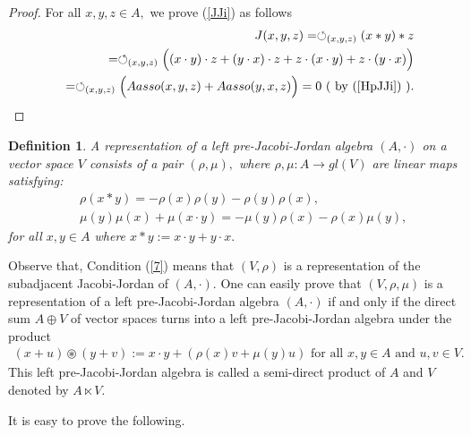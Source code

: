 \documentclass[12pt]{amsart}
\newtheorem{definition}[Theorem]{Definition}
\begin{document}
\begin{proof}
	For all $x,y,z\in A,$ we prove (\ref{JJi}) as follows
	\begin{eqnarray}
		&&J(x,y,z)=\circlearrowleft_{(x,y,z)}(x\ast y)\ast z\nonumber\\
		&&=\circlearrowleft_{(x,y,z)}
		\Big((x\cdot y)\cdot z
		+(y\cdot x)\cdot z+z\cdot(x\cdot y)+z\cdot(y\cdot x) \Big)\nonumber\\
		&&=\circlearrowleft_{(x,y,z)}\Big(Aasso(x,y,z)+Aasso(y,x,z) \Big)=0 \mbox{ ( by (\ref{HpJJi}) ).}\nonumber
	\end{eqnarray}
\end{proof}
	\begin{definition}\cite{aod}\label{rpHJJcl}
		A representation of a left pre-Jacobi-Jordan algebra $(A,\cdot)$ on a vector space $V$ consists of a pair $(\rho, \mu),$ where $\rho,\mu: A\rightarrow gl(V )$  are linear maps satisfying:
		\begin{eqnarray}
			&&\rho(x\ast y)=-\rho(x)\rho(y)-\rho(y)\rho(x),
			\label{7}\\
			&&\mu(y)\mu(x)+\mu(x\cdot y)=-\mu(y)\rho(x)-\rho(x)\mu(y), \label{8}
		\end{eqnarray}
		for all $x,y\in A$ where $x\ast y:=x\cdot y+y\cdot x.$
	\end{definition}
	Observe that, Condition (\ref{7}) means that $(V,\rho)$ is a representation of the subadjacent Jacobi-Jordan of $(A,\cdot).$ One can easily prove that $(V,\rho,\mu)$  is a representation of a left pre-Jacobi-Jordan algebra $(A,\cdot)$ if and only if the direct sum $A\oplus V$ of vector spaces turns into a left pre-Jacobi-Jordan algebra under the product
	\begin{eqnarray}
		(x+u)\circledast (y+v):=x\cdot y+(\rho(x)v+\mu(y)u) \mbox{ for all $x,y\in A$ 
			and $u,v\in V.$}\label{spjj}
	\end{eqnarray}
	This left pre-Jacobi-Jordan algebra is called a semi-direct product of $A$ and $V$  denoted  by $A\ltimes V.$
	
	It is easy to prove the following.
	
\end{document}
